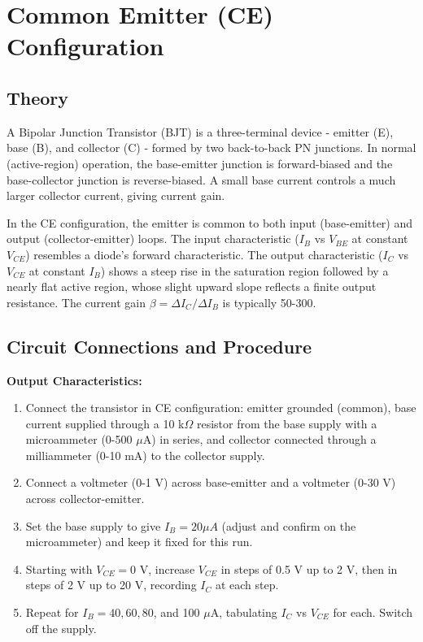 \documentclass[12pt,a4paper]{article}
\begin{document}
\section{Common Emitter (CE) Configuration}

\subsection{Theory}
A Bipolar Junction Transistor (BJT) is a three-terminal device - emitter (E), base (B), and collector (C) - formed by two back-to-back PN junctions. In normal (active-region) operation, the base-emitter junction is forward-biased and the base-collector junction is reverse-biased. A small base current controls a much larger collector current, giving current gain. 

In the CE configuration, the emitter is common to both input (base-emitter) and output (collector-emitter) loops. The input characteristic ($I_B$ vs $V_{BE}$ at constant $V_{CE}$) resembles a diode's forward characteristic. The output characteristic ($I_C$ vs $V_{CE}$ at constant $I_B$) shows a steep rise in the saturation region followed by a nearly flat active region, whose slight upward slope reflects a finite output resistance. The current gain $\beta=\Delta I_C/\Delta I_B$ is typically 50-300.

\subsection{Circuit Connections and Procedure}
\textbf{Output Characteristics:}
\begin{enumerate}
    \item Connect the transistor in CE configuration: emitter grounded (common), base current supplied through a 10 k$\Omega$ resistor from the base supply with a microammeter (0-500 $\mu$A) in series, and collector connected through a milliammeter (0-10 mA) to the collector supply.
    \item Connect a voltmeter (0-1 V) across base-emitter and a voltmeter (0-30 V) across collector-emitter.
    \item Set the base supply to give $I_B=20\mu A$ (adjust and confirm on the microammeter) and keep it fixed for this run.
    \item Starting with $V_{CE}=0$ V, increase $V_{CE}$ in steps of 0.5 V up to 2 V, then in steps of 2 V up to 20 V, recording $I_C$ at each step.
    \item Repeat for $I_B=40, 60, 80$, and 100 $\mu$A, tabulating $I_C$ vs $V_{CE}$ for each. Switch off the supply.
\end{enumerate}
\end{document}
